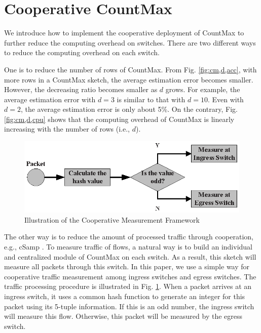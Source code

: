 \section{Cooperative CountMax}\label{subsec:distributedimplementation}


We introduce how to implement the cooperative deployment of CountMax to further reduce the computing overhead on switches. There are two different ways to reduce the computing overhead on each switch.


One is to reduce the number of rows of CountMax. From Fig. \ref{fig:cm,d,acc}, with more rows in a CountMax sketch, the average estimation error becomes smaller. However, the decreasing ratio becomes smaller as $d$ grows. For example, the average estimation error with $d=3$ is similar to that with $d=10$. Even with $d=2$, the average estimation error is only about 5\%. On the contrary, Fig. \ref{fig:cm,d,cpu} shows that the computing overhead of CountMax is linearly increasing with the number of rows (i.e., $d$).


\begin{figure}[h]
   \centering
   \includegraphics[width=\linewidth]{fig/filter_measure.eps}
   \caption{Illustration of the Cooperative Measurement Framework}
   \label{fig:filtermeasurement}
\end{figure}


The other way is to reduce the amount of processed traffic through cooperation, e.g., cSamp \cite{sekar2008csamp}. To measure traffic of flows, a natural way is to build an individual and centralized module of CountMax on each switch. As a result, this sketch will measure all packets through this switch. In this paper, we use a simple way for cooperative traffic measurement among ingress switches and egress switches. The traffic processing procedure is illustrated in Fig. \ref{fig:filtermeasurement}. When a packet arrives at an ingress switch, it uses a common hash function to generate an integer for this packet using its 5-tuple information. If this is an odd number, the ingress switch will measure this flow. Otherwise, this packet will be measured by the egress switch.

